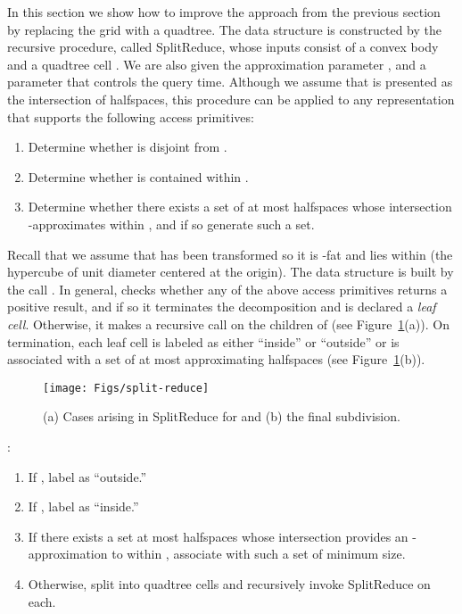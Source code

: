 \documentclass[11pt]{article}   \usepackage[letterpaper,hmargin=2.1cm,vmargin=3cm]{geometry}
\newcommand{\alg}{\textrm{SplitReduce}}
\begin{document}
In this section we show how to improve the approach from the previous section by replacing the grid with a quadtree. The data structure is constructed by the recursive procedure, called {\alg}, whose inputs consist of a convex body  and a quadtree cell . We are also given the approximation parameter , and a parameter  that controls the query time. Although we assume that  is presented as the intersection of  halfspaces, this procedure can be applied to any representation that supports the following access primitives:
\begin{enumerate}
\item[(i)] Determine whether  is disjoint from .

\item[(ii)] Determine whether  is contained within .

\item[(iii)] Determine whether there exists a set of at most  halfspaces whose intersection -approximates  within , and if so generate such a set.
\end{enumerate}


Recall that we assume that  has been transformed so it is -fat and lies within  (the hypercube of unit diameter centered at the origin). The data structure is built by the call . In general,  checks whether any of the above access primitives returns a positive result, and if so it terminates the decomposition and  is declared a \emph{leaf cell}. Otherwise, it makes a recursive call on the children of  (see Figure~\ref{fig:split-reduce}(a)). On termination, each leaf cell is labeled as either ``inside'' or ``outside'' or is associated with a set of at most  approximating halfspaces (see Figure~\ref{fig:split-reduce}(b)).

\begin{figure}[htbp]
  \centerline{\texttt{[image: Figs/split-reduce]}}
  \caption{(a) Cases arising in {\alg} for  and (b) the final subdivision.}
  \label{fig:split-reduce}
\end{figure}


\newcommand{\stepout}{1}  \newcommand{\stepin}{2}
\newcommand{\stepapx}{3}
\newcommand{\steprecur}{4}
\noindent{\alg}:
  \begin{enumerate}
\setlength{\itemsep}{-0.5ex}\setlength{\parsep}{0pt}\item[(\stepout)] If ,  label  as ``outside.''
	
	\item[(\stepin)] If , label  as ``inside.''
  
	\item[(\stepapx)] If there exists a set at most  halfspaces whose intersection provides an -approximation to  within , associate  with such a set  of minimum size.
	
  \item[(\steprecur)] Otherwise, split  into  quadtree cells and recursively invoke {\alg} on each. 
\end{enumerate}
\end{document}
